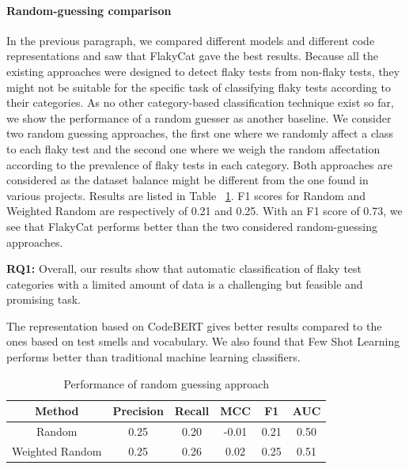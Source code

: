 \paragraph{Random-guessing comparison}
In the previous paragraph, we compared different models and different code representations and saw that FlakyCat gave the best results. Because all the existing approaches were designed to detect flaky tests from non-flaky tests, they might not be suitable for the specific task of classifying flaky tests according to their categories. As no other category-based classification technique exist so far, we show the performance of a random guesser as another baseline. We consider two random guessing approaches, the first one where we randomly affect a class to each flaky test and the second one where we weigh the random affectation according to the prevalence of flaky tests in each category. Both approaches are considered as the dataset balance might be different from the one found in various projects. Results are listed in Table ~\ref{scores-random}. F1 scores for Random and Weighted Random are respectively of 0.21 and 0.25. With an F1 score of 0.73, we see that FlakyCat performs better than the two considered random-guessing approaches. 

\begin{tcolorbox}[
    left=2pt,right=2pt,top=2pt,bottom=2pt,
    arc=0pt,
    boxrule=1.2pt
]
\textbf{RQ1:} Overall, our results show that automatic classification of flaky test categories with a limited amount of data is a challenging but feasible and promising task. 

The representation based on CodeBERT gives better results compared to the ones based on test smells and vocabulary. We also found that Few Shot Learning performs better than traditional machine learning classifiers. 

\end{tcolorbox}

\begin{table}[ht]
\caption{Performance of random guessing approach}
\centering
\begin{tabular}{c|c|c|c|c|c}
\toprule
\textbf{Method} & \textbf{Precision} & \textbf{Recall} & \textbf{MCC} & \textbf{F1} & \textbf{AUC} \\
\midrule
Random & 0.25 & 0.20 & -0.01 & 0.21 & 0.50 \\
\midrule
Weighted Random & 0.25 & 0.26 & 0.02 & 0.25 & 0.51 \\
\bottomrule
\end{tabular}
\label{scores-random}
\end{table}

